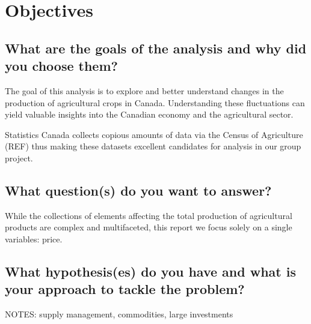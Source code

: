 \section{Objectives}

\subsection{What are the goals of the analysis and why did you choose them?}

The goal of this analysis is to explore and better understand changes in the production of agricultural crops in Canada.
Understanding these fluctuations can yield valuable insights into the Canadian economy and the agricultural sector.

Statistics Canada collects copious amounts of data via the Census of Agriculture (REF) thus making these datasets excellent candidates for analysis in our group project.

\subsection{What question(s) do you want to answer?}

While the collections of elements affecting the total production of agricultural products are complex and multifaceted, this report we focus solely on a single variables: price.


\subsection{What hypothesis(es) do you have and what is your approach to tackle the problem?}


NOTES: supply management, commodities, large investments